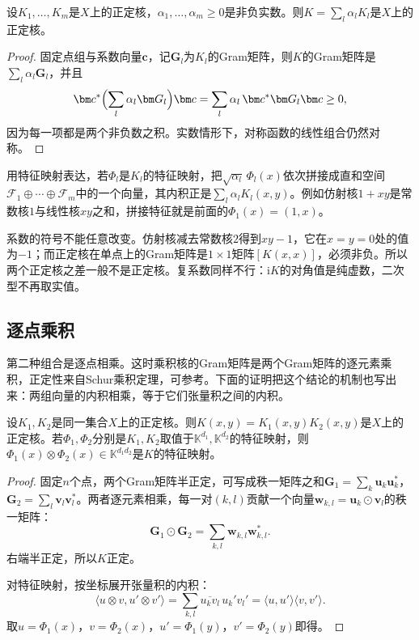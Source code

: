 \begin{theorem}[非负线性组合]
\label{thm:rkhs-nonnegative-combination}
设$K_1,\ldots,K_m$是$X$上的正定核，$\alpha_1,\ldots,\alpha_m\geq0$是非负实数。则$K=\sum_l\alpha_lK_l$是$X$上的正定核。
\end{theorem}

\begin{proof}
固定点组与系数向量$\bm c$，记$\bm G_l$为$K_l$的Gram矩阵，则$K$的Gram矩阵是$\sum_l\alpha_l\bm G_l$，并且
\[
\bm c^*\Bigl(\sum_l\alpha_l\bm G_l\Bigr)\bm c=\sum_l\alpha_l\,\bm c^*\bm G_l\bm c\geq0 ,
\]
因为每一项都是两个非负数之积。实数情形下，对称函数的线性组合仍然对称。
\end{proof}

用特征映射表达，若$\Phi_l$是$K_l$的特征映射，把$\sqrt{\alpha_l}\,\Phi_l(x)$依次拼接成直和空间$\mathcal F_1\oplus\cdots\oplus\mathcal F_m$中的一个向量，其内积正是$\sum_l\alpha_lK_l(x,y)$。例如仿射核$1+xy$是常数核$1$与线性核$xy$之和，拼接特征就是前面的$\Phi_1(x)=(1,x)$。

系数的符号不能任意改变。仿射核减去常数核$2$得到$xy-1$，它在$x=y=0$处的值为$-1$；而正定核在单点上的Gram矩阵是$1\times1$矩阵$[K(x,x)]$，必须非负。所以两个正定核之差一般不是正定核。复系数同样不行：$\mathrm iK$的对角值是纯虚数，二次型不再取实值。

\subsection{逐点乘积}
\label{sec:rkhs-pointwise-products}

第二种组合是逐点相乘。这时乘积核的Gram矩阵是两个Gram矩阵的逐元素乘积，正定性来自Schur乘积定理，可参考。下面的证明把这个结论的机制也写出来：两组向量的内积相乘，等于它们张量积之间的内积。

\begin{theorem}[逐点乘积]
\label{thm:rkhs-pointwise-product}
设$K_1,K_2$是同一集合$X$上的正定核。则$K(x,y)=K_1(x,y)K_2(x,y)$是$X$上的正定核。若$\Phi_1,\Phi_2$分别是$K_1,K_2$取值于$\mathbb K^{d_1},\mathbb K^{d_2}$的特征映射，则$\Phi_1(x)\otimes\Phi_2(x)\in\mathbb K^{d_1d_2}$是$K$的特征映射。
\end{theorem}

\begin{proof}
固定$n$个点，两个Gram矩阵半正定，可写成秩一矩阵之和$\bm G_1=\sum_k\bm u_k\bm u_k^*$，$\bm G_2=\sum_l\bm v_l\bm v_l^*$。两者逐元素相乘，每一对$(k,l)$贡献一个向量$\bm w_{k,l}=\bm u_k\odot\bm v_l$的秩一矩阵：
\[
\bm G_1\odot\bm G_2=\sum_{k,l}\bm w_{k,l}\bm w_{k,l}^* .
\]
右端半正定，所以$K$正定。

对特征映射，按坐标展开张量积的内积：
\[
\langle u\otimes v,u'\otimes v'\rangle=\sum_{k,l}\overline{u_kv_l}\,u_k'v_l'=\langle u,u'\rangle\langle v,v'\rangle .
\]
取$u=\Phi_1(x)$，$v=\Phi_2(x)$，$u'=\Phi_1(y)$，$v'=\Phi_2(y)$即得。
\end{proof}

